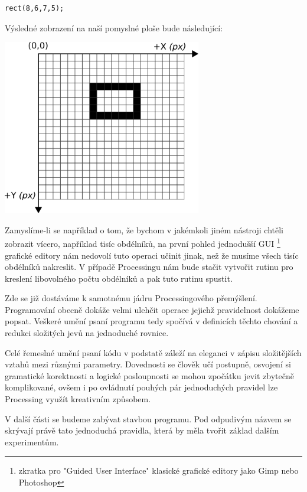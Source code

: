 \documentclass[11pt]{book}
\begin{document}
\begin{lstlisting}
rect(8,6,7,5);
\end{lstlisting}

Výsledné zobrazení na naší pomyslné ploše bude následující:

\begin{center}
\includegraphics[width = 0.65\textwidth]{imgs/gridRect2d.png}
\end{center}


Zamyslíme-li se například o tom, že bychom v jakémkoli jiném nástroji chtěli zobrazit vícero, například tisíc obdélníků, na první pohled jednodušší GUI \footnote{zkratka pro "Guided User Interface" klasické grafické editory jako Gimp nebo Photoshop} grafické editory nám nedovolí tuto operaci učinit jinak, než že musíme všech tisíc obdélníků nakreslit. V případě Processingu nám bude stačit vytvořit rutinu pro kreslení libovolného počtu obdélníků a pak tuto rutinu spustit.

Zde se již dostáváme k samotnému jádru Processingového přemýšlení. Programování obecně dokáže velmi ulehčit operace jejichž pravidelnost dokážeme popsat. Veškeré umění psaní programu tedy spočívá v definicích těchto chování a redukci složitých jevů na jednoduché rovnice.

Celé řemeslné umění psaní kódu v podstatě záleží na eleganci v zápisu složitějších vztahů mezi různými parametry. Dovednosti se člověk učí postupně, osvojení si gramatické korektnosti a logické posloupnosti se mohou zpočátku jevit zbytečně komplikované, ovšem i po ovládnutí pouhých pár jednoduchých pravidel lze Processing využít kreativním způsobem.

V další části se budeme zabývat stavbou programu. Pod odpudivým názvem se skrývají právě tato jednoduchá pravidla, která by měla tvořit základ dalším experimentům.   
\end{document}

